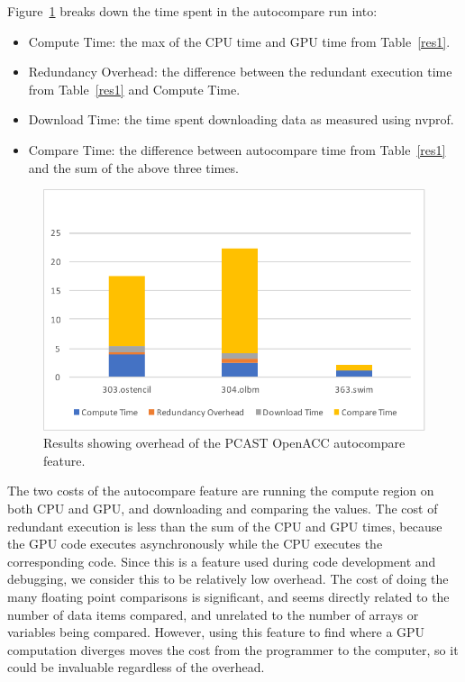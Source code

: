 Figure~\ref{fig:sle_figure} breaks down the time spent in the autocompare run into:
\begin{itemize}
\item Compute Time: the max of the CPU time and GPU time from Table~\ref{res1}.
\item Redundancy Overhead: the difference between the redundant execution time from Table~\ref{res1} and Compute Time.
\item Download Time: the time spent downloading data as measured using nvprof.
\item Compare Time: the difference between autocompare time from Table~\ref{res1} and the sum of the above three times.
\end{itemize}


\begin{figure}[t]
    \centering
    \includegraphics [width=1\linewidth] {npic2.pdf}
    \caption{Results showing overhead of the PCAST OpenACC autocompare feature.}
    \label{fig:sle_figure}
\end{figure}


The two costs of the autocompare feature are running the compute region on both CPU and GPU, and downloading and comparing the values.
The cost of redundant execution is less than the sum of the CPU and GPU times, because the GPU code executes asynchronously while the CPU executes the corresponding code.
Since this is a feature used during code development and debugging, we consider this to be relatively low overhead.
The cost of doing the many floating point comparisons is significant, and seems directly related to the number of data items compared, and unrelated to the number of arrays or variables being compared.
However, using this feature to find where a GPU computation diverges moves the cost from the programmer to the computer, so it could be invaluable regardless of the overhead.

